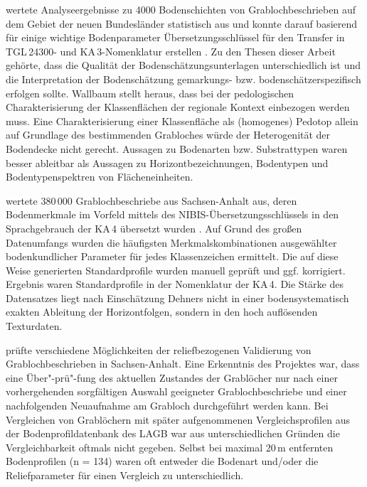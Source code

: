 \citet{Wallbaum1991} wertete Analyseergebnisse zu 4000 Bodenschichten von Grablochbeschrieben auf dem Gebiet der neuen Bundesländer statistisch aus und konnte darauf basierend für einige wichtige Bodenparameter Übersetzungsschlüssel für den Transfer in TGL\,24300- und KA\,3-Nomenklatur erstellen \citep{TGL24300,KA3}. Zu den Thesen dieser Arbeit gehörte, dass die Qualität der Bodenschätzungsunterlagen unterschiedlich ist und die Interpretation der Bodenschätzung gemarkungs- bzw. bodenschätzerspezifisch erfolgen sollte. Wallbaum stellt heraus, dass bei der pedologischen Charakterisierung der Klassenflächen der regionale Kontext einbezogen werden muss. Eine Charakterisierung einer Klassenfläche als (homogenes) Pedotop allein auf Grundlage des bestimmenden Grabloches würde der Heterogenität der Bodendecke nicht gerecht. Aussagen zu Bodenarten bzw. Substrattypen waren besser ableitbar als Aussagen zu Horizontbezeichnungen, Bodentypen und Bodentypenspektren von Flächeneinheiten.\

\citet{Dehner2005} wertete 380\,000 Grablochbeschriebe aus Sachsen-Anhalt aus, deren Bodenmerkmale im Vorfeld mittels des NIBIS-Übersetzungsschlüssels \citep{NBIS2003} in den Sprachgebrauch der KA\,4 übersetzt wurden \citep{KA4}. Auf Grund des großen Datenumfangs wurden die häufigsten Merkmalskombinationen ausgewählter bodenkundlicher Parameter für jedes Klassenzeichen ermittelt. Die auf diese Weise generierten Standardprofile wurden manuell geprüft und ggf. korrigiert. Ergebnis waren Standardprofile in der Nomenklatur der KA\,4. Die Stärke des Datensatzes liegt nach Einschätzung Dehners nicht in einer bodensystematisch exakten Ableitung der Horizontfolgen, sondern in den hoch auflösenden Texturdaten. 
 
\citet{Abiy2008} prüfte verschiedene Möglichkeiten der reliefbezogenen Validierung von Grablochbeschrieben in Sachsen-Anhalt. Eine Erkenntnis des Projektes war, dass eine Über"-prü"-fung des aktuellen Zustandes der Grablöcher nur nach einer vorhergehenden sorgfältigen Auswahl geeigneter Grablochbeschriebe und einer nachfolgenden Neuaufnahme am Grabloch durchgeführt werden kann. Bei Vergleichen von Grablöchern mit später aufgenommenen Vergleichsprofilen aus der Bodenprofildatenbank des LAGB war aus unterschiedlichen Gründen die Vergleichbarkeit oftmals nicht gegeben. Selbst bei maximal 20\,m entfernten Bodenprofilen (n = 134) waren oft entweder die Bodenart und/oder die Reliefparameter für einen Vergleich zu unterschiedlich.\          
 
